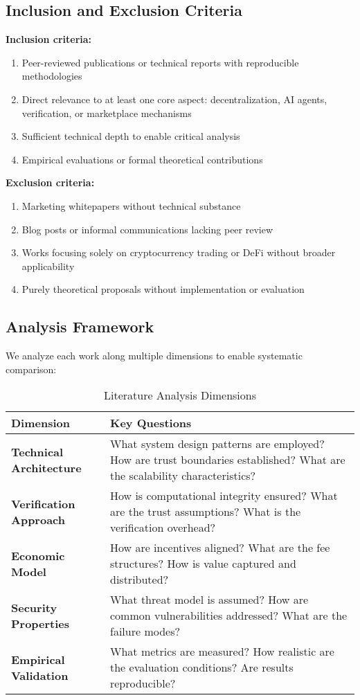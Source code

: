 \subsection{Inclusion and Exclusion Criteria}
\textbf{Inclusion criteria:}
\begin{enumerate}
    \item Peer-reviewed publications or technical reports with reproducible methodologies
    \item Direct relevance to at least one core aspect: decentralization, AI agents, verification, or marketplace mechanisms
    \item Sufficient technical depth to enable critical analysis
    \item Empirical evaluations or formal theoretical contributions
\end{enumerate}

\textbf{Exclusion criteria:}
\begin{enumerate}
    \item Marketing whitepapers without technical substance
    \item Blog posts or informal communications lacking peer review
    \item Works focusing solely on cryptocurrency trading or DeFi without broader applicability
    \item Purely theoretical proposals without implementation or evaluation
\end{enumerate}

\subsection{Analysis Framework}
We analyze each work along multiple dimensions to enable systematic comparison:

\begin{table}[h]
\centering
\caption{Literature Analysis Dimensions}
\label{tab:analysis-dimensions}
\begin{tabular}{p{3cm}p{10cm}}
\toprule
\textbf{Dimension} & \textbf{Key Questions} \\
\midrule
\textbf{Technical Architecture} & What system design patterns are employed? How are trust boundaries established? What are the scalability characteristics? \\
\textbf{Verification Approach} & How is computational integrity ensured? What are the trust assumptions? What is the verification overhead? \\
\textbf{Economic Model} & How are incentives aligned? What are the fee structures? How is value captured and distributed? \\
\textbf{Security Properties} & What threat model is assumed? How are common vulnerabilities addressed? What are the failure modes? \\
\textbf{Empirical Validation} & What metrics are measured? How realistic are the evaluation conditions? Are results reproducible? \\
\bottomrule
\end{tabular}
\end{table}

